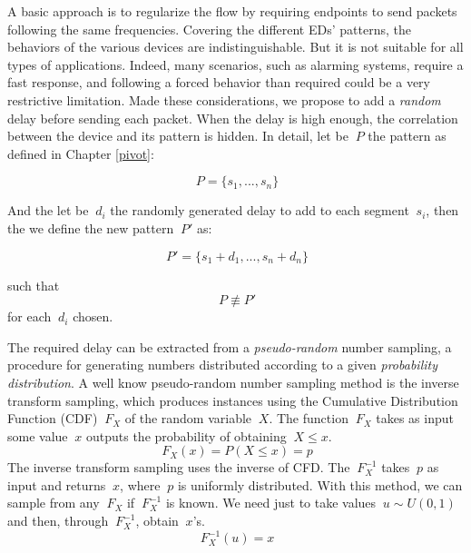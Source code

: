 A basic approach is to regularize the flow by requiring endpoints to send packets following the same frequencies. Covering the different EDs' patterns, the behaviors of the various devices are indistinguishable. But it is not suitable for all types of applications. Indeed, many scenarios, such as alarming systems, require a fast response, and following a forced behavior than required could be a very restrictive limitation. Made these considerations, we propose to add a \textit{random} delay before sending each packet. When the delay is high enough, the correlation between the device and its pattern is hidden. In detail, let be \(\ P \) the pattern as defined in Chapter \ref{pivot}:

\[\ P = \{ s_{1}, ..., s_{n} \} \]

And the let be \(\ d_{i} \) the randomly generated delay to add to each segment \(\ s_{i} \), then the we define the new pattern \(\ P' \) as:

\[\ P' = \{ s_{1} + d_{1}, ..., s_{n} + d_{n} \} \]

such that 
\[\ P \not\equiv P' \] 
for each \(\ d_{i} \) chosen.

\vspace{5mm}

The required delay can be extracted from a \textit{pseudo-random} number sampling, a procedure for generating numbers distributed according to a given \textit{probability distribution}. A well know pseudo-random number sampling method is the inverse transform sampling, which produces instances using the Cumulative Distribution Function (CDF) \(\ F_{X} \) of the random variable \(\ X \). The function \(\ F_{X} \) takes as input some value \(\ x \) outputs the probability of obtaining \(\ X \leq x \). 
\[\ F_{X}(x) = P(X \leq x) = p \]
The inverse transform sampling uses the inverse of CFD. The \(\ F_{X}^{-1} \) takes \(\ p \) as input and returns \(\ x \), where \(\ p \) is uniformly distributed. With this method, we can sample from any \(\ F_{X} \) if \(\ F_{X}^{-1}  \) is known. We need just to take values \(\ u \sim U(0,1) \) and then, through \(\ F_{X}^{-1}  \), obtain \(\ x \)'s.
\[\ F_{X}^{-1}(u) = x \]

